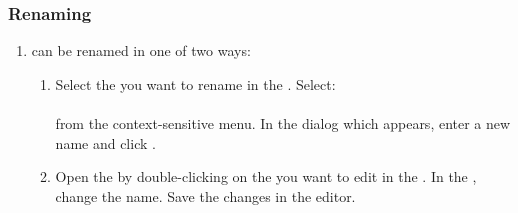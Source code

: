 \subsubsection{Renaming \gdsuites{}}
\label{tasksrenametsuite}
\begin{enumerate}
\item \gdsuites{} can be renamed in one of two ways:
\begin{enumerate}
\item Select the \gdsuite{} you want to rename in the \gdtestsuitebrowser{}. Select:\\
\\
from the context-sensitive menu. In the dialog which appears, enter a new name and click . 
\item Open the \gdtestsuiteeditor{} by double-clicking on the \gdsuite{} you want to edit in the \gdtestsuitebrowser{}.  In the \gdpropview{}, change the \gdsuite{} name. Save the changes in the editor.  
\end{enumerate}
\end{enumerate}

